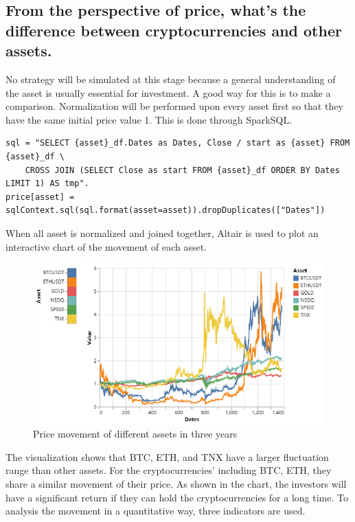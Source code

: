 \documentclass[a4paper]{article}
\begin{document}
\subsection{From the perspective of price, what's the difference between cryptocurrencies and other assets.}
No strategy will be simulated at this stage because a general understanding of the asset is usually essential for investment. A good way for this is to make a comparison. Normalization will be performed upon every asset first so that they have the same initial price value 1. This is done through SparkSQL.
\begin{verbatim}
sql = "SELECT {asset}_df.Dates as Dates, Close / start as {asset} FROM {asset}_df \
    CROSS JOIN (SELECT Close as start FROM {asset}_df ORDER BY Dates LIMIT 1) AS tmp".
price[asset] = sqlContext.sql(sql.format(asset=asset)).dropDuplicates(["Dates"])
\end{verbatim}
When all asset is normalized and joined together, Altair is used to plot an interactive chart of the movement of each asset.
\begin{figure}[H]
    \centering
    \includegraphics[scale=0.5]{Q1.png}
    \caption{Price movement of different assets in three years}
\end{figure}
The visualization shows that BTC, ETH, and TNX have a larger fluctuation range than other assets. For the cryptocurrencies’ including BTC, ETH, they share a similar movement of their price. As shown in the chart, the investors will have a significant return if they can hold the cryptocurrencies for a long time. To analysis the movement in a quantitative way, three indicators are used.
\end{document}
